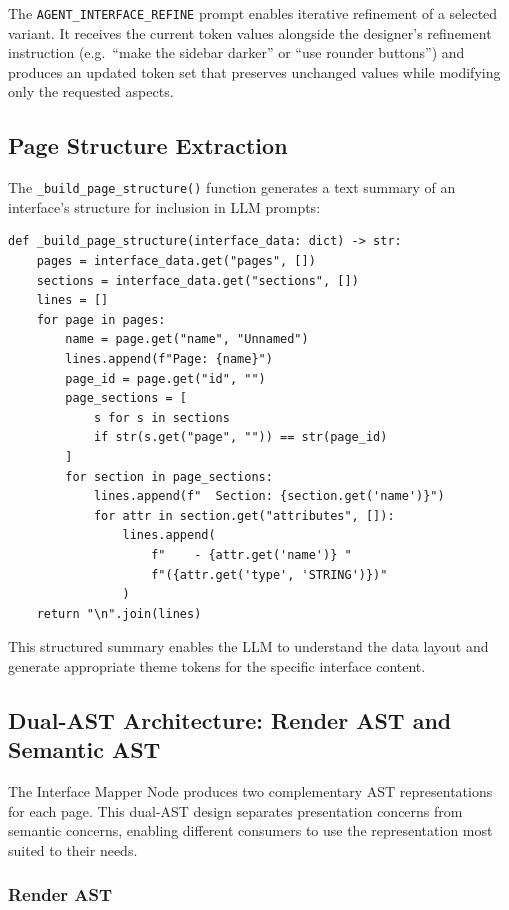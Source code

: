 The \texttt{AGENT\_INTERFACE\_REFINE} prompt enables iterative refinement of a selected variant. It receives the current token values alongside the designer's refinement instruction (e.g.\ ``make the sidebar darker'' or ``use rounder buttons'') and produces an updated token set that preserves unchanged values while modifying only the requested aspects.


\subsection{Page Structure Extraction}

The \texttt{\_build\_page\_structure()} function generates a text summary of an interface's structure for inclusion in LLM prompts:

\begin{verbatim}
def _build_page_structure(interface_data: dict) -> str:
    pages = interface_data.get("pages", [])
    sections = interface_data.get("sections", [])
    lines = []
    for page in pages:
        name = page.get("name", "Unnamed")
        lines.append(f"Page: {name}")
        page_id = page.get("id", "")
        page_sections = [
            s for s in sections 
            if str(s.get("page", "")) == str(page_id)
        ]
        for section in page_sections:
            lines.append(f"  Section: {section.get('name')}")
            for attr in section.get("attributes", []):
                lines.append(
                    f"    - {attr.get('name')} "
                    f"({attr.get('type', 'STRING')})"
                )
    return "\n".join(lines)
\end{verbatim}

This structured summary enables the LLM to understand the data layout and generate appropriate theme tokens for the specific interface content.


\subsection{Dual-AST Architecture: Render AST and Semantic AST}
\label{sec:dual_ast_impl}

The Interface Mapper Node produces two complementary AST representations for each page. This dual-AST design separates presentation concerns from semantic concerns, enabling different consumers to use the representation most suited to their needs.

\subsubsection{Render AST}

